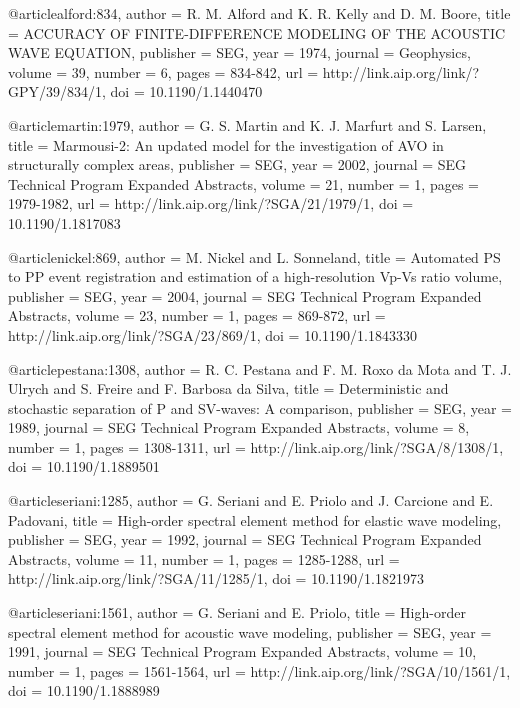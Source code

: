 {@article{alford:834,
  author =	 {R. M. Alford and K. R. Kelly and D. M. Boore},
  title =	 {ACCURACY OF FINITE-DIFFERENCE MODELING OF THE
                  ACOUSTIC WAVE EQUATION},
  publisher =	 {SEG},
  year =	 1974,
  journal =	 {Geophysics},
  volume =	 39,
  number =	 6,
  pages =	 {834-842},
  url =		 {http://link.aip.org/link/?GPY/39/834/1},
  doi =		 {10.1190/1.1440470}
}

@article{martin:1979,
  author =	 {G. S. Martin and K. J. Marfurt and S. Larsen},
  title =	 {Marmousi-2: An updated model for the investigation
                  of AVO in structurally complex areas},
  publisher =	 {SEG},
  year =	 2002,
  journal =	 {SEG Technical Program Expanded Abstracts},
  volume =	 21,
  number =	 1,
  pages =	 {1979-1982},
  url =		 {http://link.aip.org/link/?SGA/21/1979/1},
  doi =		 {10.1190/1.1817083}
}

@article{nickel:869,
  author =	 {M. Nickel and L. Sonneland},
  title =	 {Automated {PS} to {PP} event registration and
                  estimation of a high-resolution {V}p-{V}s ratio
                  volume},
  publisher =	 {SEG},
  year =	 2004,
  journal =	 {SEG Technical Program Expanded Abstracts},
  volume =	 23,
  number =	 1,
  pages =	 {869-872},
  url =		 {http://link.aip.org/link/?SGA/23/869/1},
  doi =		 {10.1190/1.1843330}
}

@article{pestana:1308,
  author =	 {R. C. Pestana and F. M. Roxo da Mota and
                  T. J. Ulrych and S. Freire and F. Barbosa
                  da Silva},
  title =	 {Deterministic and stochastic separation of {P} and
                  {SV}-waves: A comparison},
  publisher =	 {SEG},
  year =	 1989,
  journal =	 {SEG Technical Program Expanded Abstracts},
  volume =	 8,
  number =	 1,
  pages =	 {1308-1311},
  url =		 {http://link.aip.org/link/?SGA/8/1308/1},
  doi =		 {10.1190/1.1889501}
}

@article{seriani:1285,
  author =	 {G. Seriani and E. Priolo and J. Carcione and
                  E. Padovani},
  title =	 {High-order spectral element method for elastic wave
                  modeling},
  publisher =	 {SEG},
  year =	 1992,
  journal =	 {SEG Technical Program Expanded Abstracts},
  volume =	 11,
  number =	 1,
  pages =	 {1285-1288},
  url =		 {http://link.aip.org/link/?SGA/11/1285/1},
  doi =		 {10.1190/1.1821973}
}

@article{seriani:1561,
  author =	 {G. Seriani and E. Priolo},
  title =	 {High-order spectral element method for acoustic wave
                  modeling},
  publisher =	 {SEG},
  year =	 1991,
  journal =	 {SEG Technical Program Expanded Abstracts},
  volume =	 10,
  number =	 1,
  pages =	 {1561-1564},
  url =		 {http://link.aip.org/link/?SGA/10/1561/1},
  doi =		 {10.1190/1.1888989}
}

}
